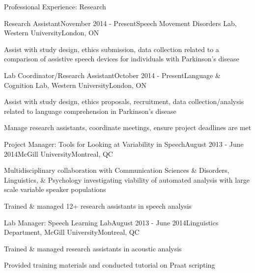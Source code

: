 \documentclass{resume} %
\begin{document}
\begin{rSection}{Professional Experience: Research}

	\begin{rSubsection}{Research Assistant}{November 2014 - Present}{Speech Movement Disorders Lab, Western University}{London, ON}
	\item Assist with study design, ethics submission, data collection related to a comparison of assistive speech devices for individuals with Parkinson's disease
	\end{rSubsection}
	
	
	\begin{rSubsection}{Lab Coordinator/Research Assistant}{October 2014 - Present}{Language \& Cognition Lab, Western University}{London, ON}
	\item Assist with study design, ethics proposals, recruitment, data collection/analysis related to language comprehension in Parkinson's disease
	\item Manage research assistants, coordinate meetings, ensure project deadlines are met
	\end{rSubsection}
	
	
	\begin{rSubsection}{Project Manager: Tools for Looking at Variability in Speech}{August 2013 - June 2014}{McGill University}{Montreal, QC}
	\item Multidisciplinary collaboration with Communication Sciences \& Disorders, Linguistics, \& Psychology investigating viability of automated analysis with large scale variable speaker populations
	\item Trained \& managed 12+ research assistants in speech analysis
	\end{rSubsection}
	
	
	\begin{rSubsection}{Lab Manager: Speech Learning Lab}{August 2013 - June 2014}{Linguistics Department, McGill University}{Montreal, QC}
	\item Trained \& managed research assistants in acoustic analysis
	\item Provided training materials and conducted tutorial on Praat scripting
	\end{rSubsection}
	

\end{rSection}
\end{document}

